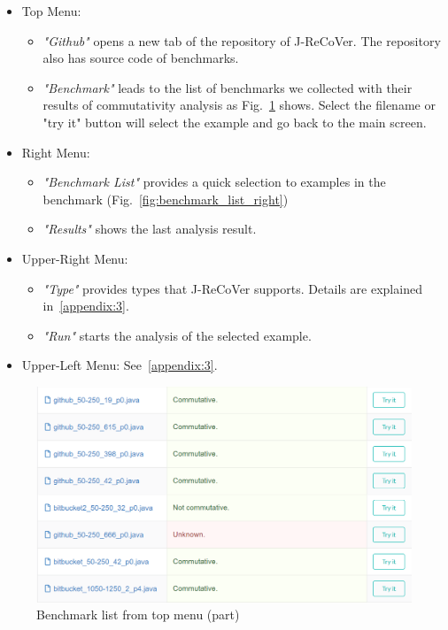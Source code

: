 \begin{itemize}
\item
Top Menu:
\begin{itemize}
\item
\emph{"Github"} opens a new tab of the repository of J-ReCoVer. The repository also has source code of benchmarks.
\item
\emph{"Benchmark"} leads to the list of benchmarks we collected with their results of commutativity analysis as Fig.~\ref{fig:benchmark_list} shows. Select the filename or "try it" button will select the example and go back to the main screen.
\end{itemize}
\item
Right Menu:
\begin{itemize}
\item
\emph{"Benchmark List"} provides a quick selection to examples in the benchmark (Fig.~\ref{fig:benchmark_list_right})
\item
\emph{"Results"} shows the last analysis result.
\end{itemize}
\item
Upper-Right Menu:
\begin{itemize}
\item
\emph{"Type"} provides types that J-ReCoVer supports. Details are explained in~\ref{appendix:3}.
\item
\emph{"Run"} starts the analysis of the selected example.
\end{itemize}
\item
Upper-Left Menu: See~\ref{appendix:3}.
\end{itemize}

\begin{figure}
\begin{center}
\includegraphics[width=.8\linewidth]{screenshots/benchmark_list}
\caption{Benchmark list from top menu (part)}
\label{fig:benchmark_list}
\end{center}
\end{figure}

